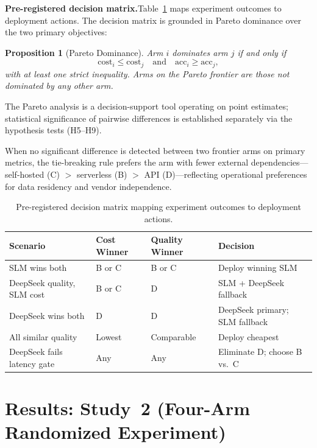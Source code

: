 \documentclass{article}
\newtheorem{proposition}{Proposition}
\begin{document}
\textbf{Pre-registered decision matrix.}\quad Table~\ref{tab:decision} maps experiment outcomes to deployment actions. The decision matrix is grounded in Pareto dominance over the two primary objectives:

\begin{proposition}[Pareto Dominance]
\label{prop:pareto}
\emph{Arm $i$ dominates arm $j$ if and only if}
\[
  \mathrm{cost}_i \leq \mathrm{cost}_j \quad \text{and} \quad \mathrm{acc}_i \geq \mathrm{acc}_j,
\]
\emph{with at least one strict inequality. Arms on the Pareto frontier are those not dominated by any other arm.}
\end{proposition}

The Pareto analysis is a decision-support tool operating on point estimates; statistical significance of pairwise differences is established separately via the hypothesis tests (H5--H9).

When no significant difference is detected between two frontier arms on primary metrics, the tie-breaking rule prefers the arm with fewer external dependencies---self-hosted (C) $>$ serverless (B) $>$ API (D)---reflecting operational preferences for data residency and vendor independence.

\begin{table}[htbp]
\centering
\caption{Pre-registered decision matrix mapping experiment outcomes to deployment actions.}
\label{tab:decision}
\begin{tabular}{llll}
\toprule
Scenario & Cost Winner & Quality Winner & Decision \\
\midrule
SLM wins both & B or C & B or C & Deploy winning SLM \\
DeepSeek quality, SLM cost & B or C & D & SLM + DeepSeek fallback \\
DeepSeek wins both & D & D & DeepSeek primary; SLM fallback \\
All similar quality & Lowest & Comparable & Deploy cheapest \\
DeepSeek fails latency gate & Any & Any & Eliminate D; choose B vs.\ C \\
\bottomrule
\end{tabular}
\end{table}

\section{Results: Study~2 (Four-Arm Randomized Experiment)}
\label{sec:rct-results}
\end{document}
